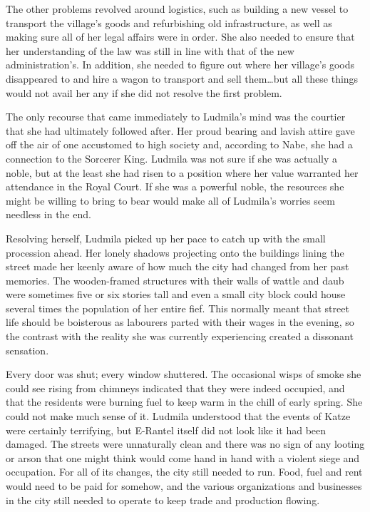  

The other problems revolved around logistics, such as building a new vessel to transport the village’s goods and refurbishing old infrastructure, as well as making sure all of her legal affairs were in order. She also needed to ensure that her understanding of the law was still in line with that of the new administration’s. In addition, she needed to figure out where her village’s goods disappeared to and hire a wagon to transport and sell them…but all these things would not avail her any if she did not resolve the first problem.

 

The only recourse that came immediately to Ludmila’s mind was the courtier that she had ultimately followed after. Her proud bearing and lavish attire gave off the air of one accustomed to high society and, according to Nabe, she had a connection to the Sorcerer King. Ludmila was not sure if she was actually a noble, but at the least she had risen to a position where her value warranted her attendance in the Royal Court. If she was a powerful noble, the resources she might be willing to bring to bear would make all of Ludmila’s worries seem needless in the end.

 

Resolving herself, Ludmila picked up her pace to catch up with the small procession ahead. Her lonely shadows projecting onto the buildings lining the street made her keenly aware of how much the city had changed from her past memories. The wooden-framed structures with their walls of wattle and daub were sometimes five or six stories tall and even a small city block could house several times the population of her entire fief. This normally meant that street life should be boisterous as labourers parted with their wages in the evening, so the contrast with the reality she was currently experiencing created a dissonant sensation.

 

Every door was shut; every window shuttered. The occasional wisps of smoke she could see rising from chimneys indicated that they were indeed occupied, and that the residents were burning fuel to keep warm in the chill of early spring. She could not make much sense of it. Ludmila understood that the events of Katze were certainly terrifying, but E-Rantel itself did not look like it had been damaged. The streets were unnaturally clean and there was no sign of any looting or arson that one might think would come hand in hand with a violent siege and occupation. For all of its changes, the city still needed to run. Food, fuel and rent would need to be paid for somehow, and the various organizations and businesses in the city still needed to operate to keep trade and production flowing.

